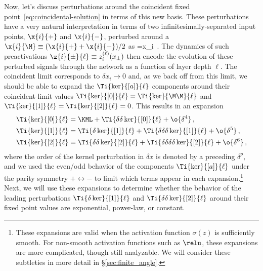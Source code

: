 Now, let's discuss perturbations around the coincident fixed point~\eqref{eq:coincidental-solution} in terms of this new basis.
These perturbations have a very natural interpretation in terms of two infinitesimally-separated input points, $\x{i}{+}$ and $\x{i}{-}$, perturbed around a  $\x{i}{\M} \equiv (\x{i}{+} + \x{i}{-})/2$ as
\be\label{eq:x-pm}
=\pm{}\delta x_i\, .
\ee
The dynamics of such preactivations $\z{i}{\pm}{\ell}\equiv z_i^{(\ell)}(x_\pm)$ then
encode the evolution of these perturbed signals through the network as a function of layer depth $\ell$.
The coincident limit corresponds to $\delta x_i\rightarrow0$ and, as we back off from this limit, we should be able to expand the $\Ti{\ker}{[a]}{\ell}$ components around their coincident-limit values $\Ti{\ker}{[0]}{\ell}=\Ti{\ker}{\M\M}{\ell}$ and $\Ti{\ker}{[1]}{\ell}=\Ti{\ker}{[2]}{\ell}=0$.
This results in an expansion
\begin{align}\label{eq:kernel-expand-1}
\Ti{\ker}{[0]}{\ell}&=\KML+\Ti{\delta\delta\ker}{[0]}{\ell}+\o{\delta^4}\, ,\\
\Ti{\ker}{[1]}{\ell}&=\Ti{\delta\ker}{[1]}{\ell}+\Ti{\delta\delta\delta\ker}{[1]}{\ell}+\o{\delta^5}\, , \label{eq:kernel-expand-2}\\
\Ti{\ker}{[2]}{\ell}&=\Ti{\delta\delta\ker}{[2]}{\ell}+\Ti{\delta\delta\delta\delta\ker}{[2]}{\ell}+\o{\delta^6}\, , \label{eq:kernel-expand-3}
\end{align}
where the order of the kernel perturbation in $\delta x$ is denoted by a preceding $\delta^p$, and we used the even/odd behavior of the components $\Ti{\ker}{[a]}{\ell}$ under the parity symmetry $+\leftrightarrow -$ to limit which terms appear in each expansion.\footnote{\label{foot:kink1}These expansions are valid when the activation function $\sigma(z)$ is sufficiently smooth. For non-smooth activation functions such as $\relu$, these expansions are more complicated, though still analyzable. We will consider these subtleties in more detail in \S\ref{sec:finite_angle}.
}
Next, we will use these expansions to determine whether the behavior of the leading perturbations $\Ti{\delta\ker}{[1]}{\ell}$ and $\Ti{\delta\delta\ker}{[2]}{\ell}$ around their fixed point values are exponential, power-law, or constant. 

